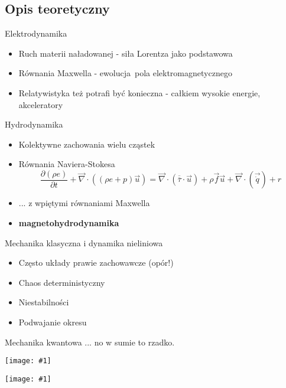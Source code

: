\documentclass{beamer}
\newcommand {\framedgraphic}[1] {
        \begin{center}
            \texttt{[image: \#1]}
        \end{center}
}
\begin{document}
\subsection{Opis teoretyczny}

\begin{frame}[t]{Elektrodynamika}
  \begin{itemize}[<+->]
    \item Ruch materii naładowanej - siła Lorentza jako podstawowa
    \item Równania Maxwella - ewolucja pola elektromagnetycznego
    \item Relatywistyka też potrafi być konieczna - całkiem wysokie energie, akceleratory
  \end{itemize}
\end{frame}

\begin{frame}[t]{Hydrodynamika}
  \begin{itemize}[<+->]
    \item Kolektywne zachowania wielu cząstek
    \item Równania Naviera-Stokesa
      \begin{equation}
      \frac{\partial(\rho e)}{\partial t} + \overrightarrow{\nabla}\cdot((\rho e + p)\overrightarrow{u}) = \overrightarrow{\nabla}\cdot(\overline{\overline{\tau}}\cdot\overrightarrow{u}) + \rho\overrightarrow{f}\overrightarrow{u} + \overrightarrow{\nabla}\cdot(\overrightarrow{\dot{q}})+r \end{equation}

    \item ... z wpiętymi równaniami Maxwella
    \item \textbf{magnetohydrodynamika}
  \end{itemize}

\end{frame}

\begin{frame}[t]{Mechanika klasyczna i dynamika nieliniowa}
  \begin{itemize}[<+->]
    \item Często układy prawie zachowawcze (opór!)
    \item Chaos deterministyczny
    \item Niestabilności
    \item Podwajanie okresu
  \end{itemize}
\end{frame}

\begin{frame}[t]{Mechanika kwantowa}
  ... no w sumie to rzadko.
  \framedgraphic{img/google_plasma.png}
  \pause
  \framedgraphic{img/google_qplasma.png}
\end{frame}
\end{document}
